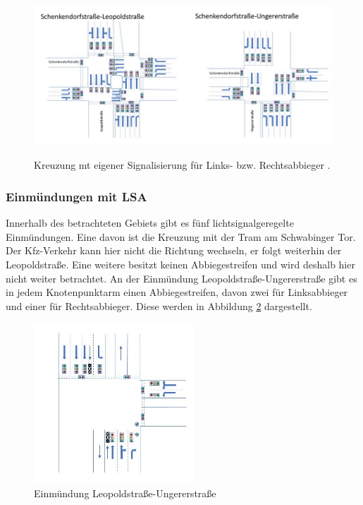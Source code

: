 \begin{savenotes}
	\begin{figure}[H]
		\centering
		\includegraphics[width=12cm,height=6cm]{figures/Kreuzungen_eigene_Abbiegephase}
		\caption[Kreuzungen mit eigener Signalisierung für Links- bzw. Rechtsabbieger]{Kreuzung mt eigener Signalisierung für Links- bzw. Rechtsabbieger \parencite[S.30-31]{Kutsch.05.04.2018}.}\label{fig:eigene_Signalisierung}
	\end{figure}
\end{savenotes}

\subsubsection{Einmündungen mit LSA}
Innerhalb des betrachteten Gebiets gibt es fünf lichtsignalgeregelte Einmündungen. Eine davon ist die Kreuzung mit der Tram am Schwabinger Tor. Der Kfz-Verkehr kann hier nicht die Richtung wechseln, er folgt weiterhin der Leopoldstraße. Eine weitere besitzt keinen Abbiegestreifen und wird deshalb hier nicht weiter betrachtet. An der Einmündung Leopoldstraße-Ungererstraße gibt es in jedem Knotenpunktarm einen Abbiegestreifen, davon zwei für Linksabbieger und einer für Rechtsabbieger. Diese werden in Abbildung \ref{fig:Einmüngung_Abbiegestreifen} dargestellt.

\begin{savenotes}
	\begin{figure}[H]
		\centering
		\includegraphics[width=6cm,height=6cm]{figures/Einmuendung_Abbiegestreifen}
		\caption[Einmündung Leopoldstraaße-Ungererstraße]{Einmündung Leopoldstraße-Ungererstraße}\label{fig:Einmüngung_Abbiegestreifen}
	\end{figure}
\end{savenotes}

